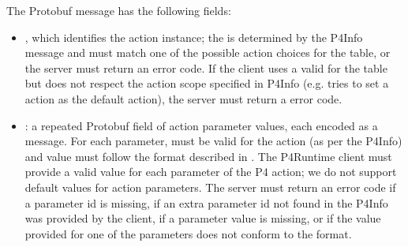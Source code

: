 \documentclass[11pt]{article}
\begin{document}
{%
The  Protobuf message has the following fields:%

\begin{itemize}%

\item{}
, which identifies the action instance; the  is
determined by the P4Info message and must match one of the possible action
choices for the table, or the server must return an  error
code. If the client uses a valid  for the table but does not
respect the action scope specified in P4Info (e.g. tries to set a 
action as the default action), the server must return a 
error code.%

\item{}
: a repeated Protobuf field of action parameter values, each encoded
as a  message. For each parameter,  must be valid for the
action (as per the P4Info) and value must follow the format described in
. The P4Runtime client must provide a valid
value for each parameter of the P4 action; we do not support default values
for action parameters. The server must return an  error code
if a parameter id is missing, if an extra parameter \textemdash{} id not found in the
P4Info \textemdash{} was provided by the client, if a parameter value is missing, or if
the value provided for one of the parameters does not conform to the
 format.%
\end{itemize}%

}
\end{document}
